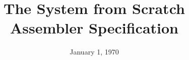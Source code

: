 \documentclass{article}
\begin{document}
\title{The System from Scratch Assembler Specification}
\author{}
\date{January 1, 1970}
\maketitle
\end{document}
